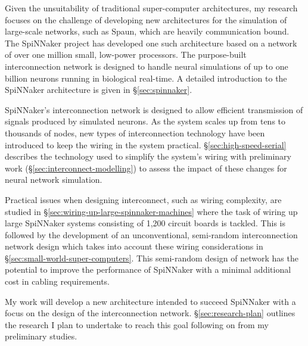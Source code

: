 		Given the unsuitability of traditional super-computer architectures, my
		research focuses on the challenge of developing new architectures for the
		simulation of large-scale networks, such as Spaun, which are heavily
		communication bound.  The SpiNNaker project \cite{furber06} has developed
		one such architecture based on a network of over one million small,
		low-power processors. The purpose-built interconnection network is designed
		to handle neural simulations of up to one billion neurons running in
		biological real-time. A detailed introduction to the SpiNNaker architecture
		is given in \S\ref{sec:spinnaker}.
		
		SpiNNaker's interconnection network is designed to allow efficient
		transmission of signals produced by simulated neurons. As the system scales
		up from tens to thousands of nodes, new types of interconnection technology
		have been introduced to keep the wiring in the system practical.
		\S\ref{sec:high-speed-serial} describes the technology used to simplify the
		system's wiring with preliminary work (\S\ref{sec:interconnect-modelling})
		to assess the impact of these changes for neural network simulation.
		
		Practical issues when designing interconnect, such as wiring complexity, are
		studied in \S\ref{sec:wiring-up-large-spinnaker-machines} where the task of
		wiring up large SpiNNaker systems consisting of 1,200 circuit boards is
		tackled. This is followed by the development of an unconventional,
		semi-random interconnection network design which takes into account these
		wiring considerations in \S\ref{sec:small-world-super-computers}. This
		semi-random design of network has the potential to improve the performance
		of SpiNNaker with a minimal additional cost in cabling requirements.
	
		My work will develop a new architecture intended to succeed SpiNNaker with a
		focus on the design of the interconnection network.
		\S\ref{sec:research-plan} outlines the research I plan to undertake to reach
		this goal following on from my preliminary studies.

